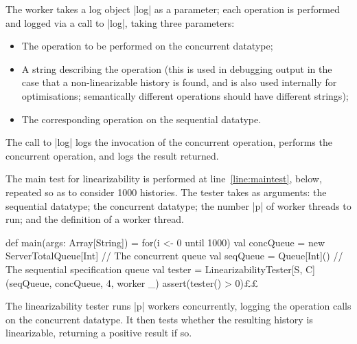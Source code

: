\begin{slide}

The worker takes a log object |log| as a parameter; each operation is
performed and logged via a call to |log|, taking three parameters:
%
\begin{itemize}

\item
The operation to be performed on the concurrent datatype;

\item A string describing the operation (this is used in debugging output in
the case that a non-linearizable history is found, and is also used internally
for optimisations; semantically different operations should have different
strings);

\item
The corresponding operation on the sequential datatype.
\end{itemize}

The call to |log| logs the invocation of the concurrent operation,
performs the concurrent operation, and logs the result returned.
\end{slide}
\begin{slide}

The main test for linearizability is performed at line~\ref{line:maintest},
below, repeated so as to consider 1000 histories.  The  tester
takes as arguments: the sequential datatype; the concurrent datatype; the
number |p| of worker threads to run; and the definition of a worker thread.
%
\begin{scala}[numbers=left,numberstyle=\scriptsize]
  def main(args: Array[String]) = for(i <- 0 until 1000){
    val concQueue = new ServerTotalQueue[Int] // The concurrent queue
    val seqQueue = Queue[Int]() // The sequential specification queue
    val tester = LinearizabilityTester[S, C](seqQueue, concQueue, 4, worker _)
    assert(tester() > 0)£\label{line:maintest}£
  }
\end{scala}
%
The linearizability tester runs |p| workers concurrently, logging the
operation calls on the concurrent datatype.  It then tests whether the
resulting history is linearizable, returning a positive result if so.
\end{slide}


